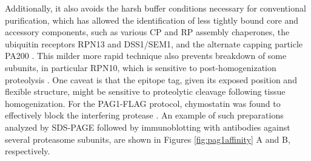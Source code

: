 Additionally, it also avoids the harsh buffer conditions necessary for conventional purification, which has allowed the identification of less tightly bound core and accessory components, such as various CP and RP assembly chaperones, the ubiquitin receptors RPN13 and DSS1/SEM1, and the alternate capping particle PA200 \citep{book10, russell13}.  This milder more rapid technique also prevents breakdown of some subunits, in particular RPN10, which is sensitive to post-homogenization proteolysis \citep{yang04}.  One caveat is that the epitope tag, given its exposed position and flexible structure, might be sensitive to proteolytic cleavage following tissue homogenization.  For the PAG1-FLAG protocol, chymostatin was found to effectively block the interfering protease \citep{book10}.  An example of such preparations analyzed by SDS-PAGE followed by immunoblotting with antibodies against several proteasome subunits, are shown in Figures  \ref{fig:pag1affinity} A and B, respectively.

